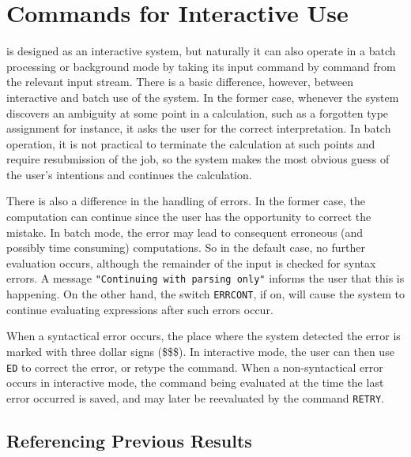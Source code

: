 \chapter{Commands for Interactive Use}

{\REDUCE} is designed as an interactive system, but naturally it can also
operate in a batch processing or background mode by taking its input
command by command from the relevant input stream. There is a basic
difference, however, between interactive and batch use of the system. In
the former case, whenever the system discovers an ambiguity at some point
in a calculation, such as a forgotten type assignment for instance, it asks
the user for the correct interpretation. In batch operation, it is not
practical to terminate the calculation at such points and require
resubmission of the job, so the system makes the most obvious guess of the
user's intentions and continues the calculation.

\hypertarget{switch:ERRCONT}{}
There is also a difference in the handling of errors.  In the former case,
the computation can continue since the user has the opportunity to correct
the mistake.  In batch mode, the error may lead to consequent erroneous
(and possibly time consuming) computations.  So in the default case, no
further evaluation occurs, although the remainder of the input is checked
for syntax errors.  A message {\tt "Continuing with parsing only"}
informs the user that this is happening.  On the other hand, the switch
{\tt ERRCONT}, if on, will cause the system to continue
evaluating expressions after such errors occur.

\hypertarget{command:RETRY}{}
When a syntactical error occurs, the place where the system detected the
error is marked with three dollar signs (\$\$\$). In interactive mode, the
user can then use {\tt ED} to correct the error, or retype the
command.  When a non-syntactical error occurs in interactive mode, the
command being evaluated at the time the last error occurred is saved, and
may later be reevaluated by the command {\tt RETRY}.

\section{Referencing Previous Results}

